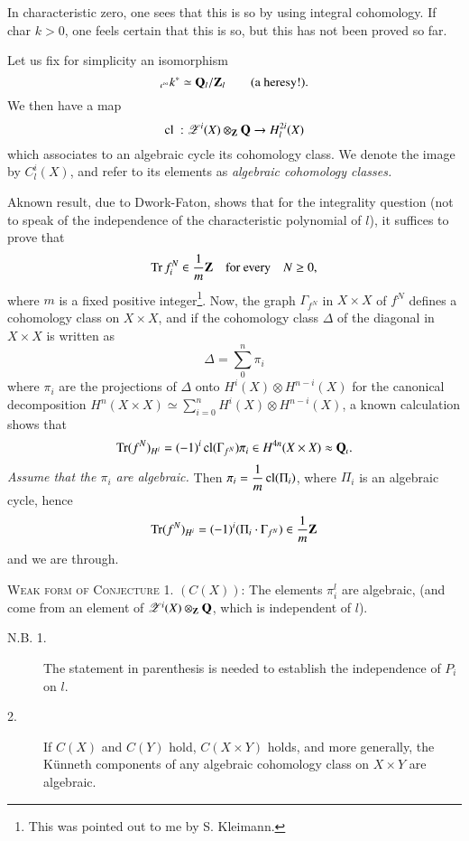 In characteristic zero, one sees that this is so by using integral cohomology. If char $k>0$, one feels certain that this is so, but this has not been proved so far.

Let us fix for simplicity an isomorphism
\begin{equation*}
{}_{\iota^{\infty}}k^{*}\simeq \bfQ_{l}/\bfZ_{l}\tag*{(\text{a heresy!}).}
\end{equation*}
We then have a map
$$
\text{cl } : \mathscr{Z}^{i}(X)\otimes_{\mathbf{Z}}\mathbf{Q}\to H^{2i}_{l}(X) 
$$
which associates to an algebraic cycle its cohomology class. We denote the image by $C^{i}_{l}(X)$, and refer to its elements as {\em algebraic cohomology classes.}

A\pageoriginale known result, due to Dwork-Faton, shows that for the integrality question (not to speak of the independence of the characteristic polynomial of $l$), it suffices to prove that
$$
\operatorname{\mathrm{Tr}} f^{N}_{i}\in \dfrac{1}{m}\mathbf{Z}\quad\text{for every}\quad N\geq 0,
$$
where $m$ is a fixed positive integer\footnote{This was pointed out to me by S. Kleimann.}. Now, the graph $\Gamma_{f^{N}}$ in $X\times X$ of $f^{N}$ defines a cohomology class on $X\times X$, and if the cohomology class $\Delta$ of the diagonal in $X\times X$ is written as
$$
\Delta=\sum\limits^{n}_{0}\pi_{i}
$$
where $\pi_{i}$ are the projections of $\Delta$ onto $H^{i}(X)\otimes H^{n-i}(X)$ for the canonical decomposition $H^{n}(X\times X)\simeq \sum\limits^{n}_{i=0}H^{i}(X)\otimes H^{n-i}(X)$, a known calculation shows that
$$
\operatorname{\mathrm{Tr}}(f^{N})_{H^{i}}=(-1)^{i}\operatorname{\mathrm{cl}}(\Gamma_{f^{N}})\pi_{i}\in H^{4n}(X\times X)\approx \mathbf{Q}_{\iota}.
$$
{\em Assume that the $\pi_{i}$ are algebraic.} Then $\pi_{i}=\dfrac{1}{m}\operatorname{\mathrm{cl}}(\Pi_{i})$, where $\Pi_{i}$ is an algebraic cycle, hence
$$
\operatorname{\mathrm{Tr}}(f^{N})_{H^{i}}=(-1)^{i}(\Pi_{i}\cdot \Gamma_{f^{N}})\in \dfrac{1}{m}\mathbf{Z}
$$
and we are through.

\textsc{Weak form of Conjecture 1.} $(C(X))$: The elements $\pi^{l}_{i}$ are algebraic, (and come from an element of $\mathscr{Z}^{i}(X)\otimes_{\mathbf{Z}}\mathbf{Q}$, which is independent of $l$).
\begin{description}
\item[N.B. 1.] The statement in parenthesis is needed to establish the independence of $P_{i}$ on $l$.
 
\item[2.] If $C(X)$ and $C(Y)$ hold, $C(X\times Y)$ holds, and more generally, the K\"unneth components of any algebraic cohomology class on $X\times Y$ are algebraic.
\end{description}

